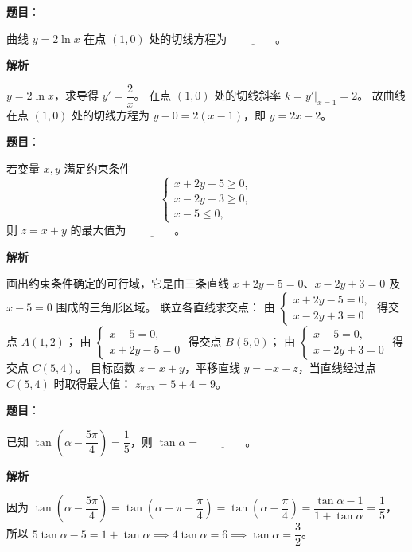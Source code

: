 
\begin{answer}

\textbf{题目}：

曲线 $y=2\ln x$ 在点 $(1,0)$ 处的切线方程为 $\underline{\qquad\qquad}$。

\textbf{解析}

$y=2\ln x$，求导得 $y'=\dfrac2x$。
在点 $(1,0)$ 处的切线斜率 $k = y'|_{x=1} = 2$。
故曲线在点 $(1,0)$ 处的切线方程为 $y-0=2(x-1)$，即 $y=2x-2$。


\end{answer}
\begin{answer}

\textbf{题目}：

若变量 $x,y$ 满足约束条件
\nopagebreak[4]
\[
\begin{cases}
x+2y-5\geqslant0,\\
x-2y+3\geqslant0,\\
x-5\leqslant0,
\end{cases}
\]
则 $z=x+y$ 的最大值为 $\underline{\qquad\qquad}$。

\textbf{解析}

画出约束条件确定的可行域，它是由三条直线 $x+2y-5=0$、$x-2y+3=0$ 及 $x-5=0$ 围成的三角形区域。
联立各直线求交点：
由 $\begin{cases}x+2y-5=0,\\ x-2y+3=0\end{cases}$ 得交点 $A(1,2)$；
由 $\begin{cases}x-5=0,\\ x+2y-5=0\end{cases}$ 得交点 $B(5,0)$；
由 $\begin{cases}x-5=0,\\ x-2y+3=0\end{cases}$ 得交点 $C(5,4)$。
目标函数 $z=x+y$，平移直线 $y=-x+z$，当直线经过点 $C(5,4)$ 时取得最大值：
$z_{\max} = 5+4 = 9$。


\end{answer}
\begin{answer}

\textbf{题目}：

已知 $\tan\left(\alpha-\dfrac{5\pi}{4}\right)=\dfrac15$，则 $\tan\alpha=\underline{\qquad\qquad}$。

\textbf{解析}

因为 $\tan\left(\alpha-\dfrac{5\pi}{4}\right) = \tan\left(\alpha-\pi-\dfrac\pi4\right) = \tan\left(\alpha-\dfrac\pi4\right) = \dfrac{\tan\alpha-1}{1+\tan\alpha} = \dfrac15$，
所以 $5\tan\alpha-5 = 1+\tan\alpha \implies 4\tan\alpha=6 \implies \tan\alpha = \dfrac32$。


\end{answer}
